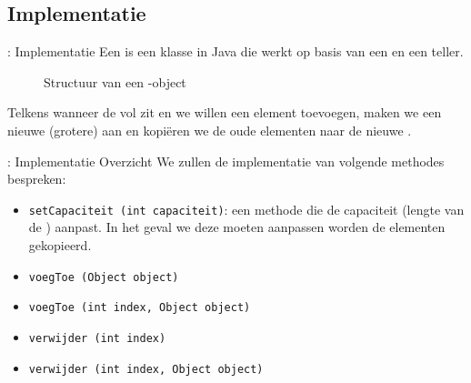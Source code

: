 \subsection{Implementatie}
\begin{frame}[fragile]{\dsarraylist{}: Implementatie}
Een \dsarraylist{} is een klasse in Java die werkt op basis van een \dsarray{} en een teller.
\begin{figure}
\centering
{}
\caption{Structuur van een \dsarraylist{}-object}
\end{figure}
Telkens wanneer de \dsarray{} vol zit en we willen een element toevoegen, maken we een nieuwe (grotere) \dsarray{} aan en kopi\"eren we de oude elementen naar de nieuwe \dsarray{}.
\end{frame}
\begin{frame}{\dsarraylist{}: Implementatie Overzicht}
We zullen de implementatie van volgende methodes bespreken:
\begin{itemize}
 \item \texttt{setCapaciteit (int capaciteit)}: een methode die de capaciteit (lengte van de \dsarray{}) aanpast. In het geval we deze moeten aanpassen worden de elementen gekopieerd.
 \item \texttt{voegToe (Object object)}
 \item \texttt{voegToe (int index, Object object)}
 \item \texttt{verwijder (int index)}
 \item \texttt{verwijder (int index, Object object)}
\end{itemize}
\end{frame}
